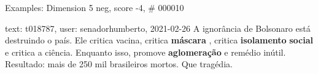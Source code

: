 \begin{frame}{Examples: Dimension 5 neg, score -4, \# 000010}
\footnotesize
\begin{alertblock}{text: t018787, user: senadorhumberto, 2021-02-26}
A ignorância de Bolsonaro está destruindo o país. Ele critica vacina, critica 
\textbf{máscara} , critica \textbf{isolamento} \textbf{social} e critica a 
ciência. Enquanto isso, promove \textbf{aglomeração} e remédio inútil. 
Resultado: mais de 250 mil brasileiros mortos. Que tragédia. 
\end{alertblock}
\end{frame}
